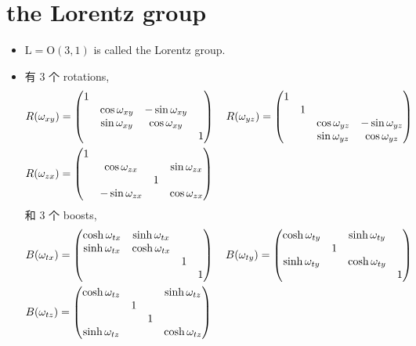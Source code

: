 \section{the Lorentz group}
\begin{itemize}
	\item $\mathrm{L} = \mathrm{O}(3, 1)$ is called the Lorentz group.
	
	\item 有 3 个 rotations,
	\begin{align}
		& R(\omega_{x y}) = \begin{pmatrix}
			1 & & & \\
			& \cos \omega_{x y} & - \sin \omega_{x y} & \\
			& \sin \omega_{x y} & \cos \omega_{x y} & \\
			& & & 1
		\end{pmatrix} \quad R(\omega_{y z}) = \begin{pmatrix}
			1 & & & \\
			& 1 & & \\
			& & \cos \omega_{y z} & - \sin \omega_{y z} \\
			& & \sin \omega_{y z} & \cos \omega_{y z}
		\end{pmatrix} \notag \\
		& R(\omega_{z x}) = \begin{pmatrix}
			1 & & & \\
			& \cos \omega_{z x} & & \sin \omega_{z x} \\
			& & 1 & \\
			& - \sin \omega_{z x} & & \cos \omega_{z x}
		\end{pmatrix}
	\end{align}
	和 3 个 boosts,
	\begin{align}
		& B(\omega_{t x}) = \begin{pmatrix}
			\cosh \omega_{t x} & \sinh \omega_{t x} & & \\
			\sinh \omega_{t x} & \cosh \omega_{t x} & & \\
			& & 1 & \\
			& & & 1
		\end{pmatrix} \quad B(\omega_{t y}) = \begin{pmatrix}
			\cosh \omega_{t y} & & \sinh \omega_{t y} & \\
			& 1 & & \\
			\sinh \omega_{t y} & & \cosh \omega_{t y} & \\
			& & & 1
		\end{pmatrix} \notag \\
		& B(\omega_{t z}) = \begin{pmatrix}
			\cosh \omega_{t z} & & & \sinh \omega_{t z} \\
			& 1 & & \\
			& & 1 & \\
			\sinh \omega_{t z} & & & \cosh \omega_{t z}
		\end{pmatrix}
	\end{align}
\end{itemize}

